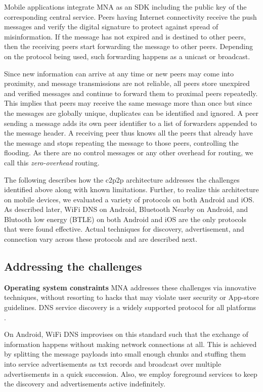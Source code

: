\documentclass[conference]{IEEEtran}
\begin{document}
Mobile applications integrate MNA as an SDK including the public key
of the corresponding central service. Peers having Internet
connectivity receive the push messages and verify the digital
signature to protect against spread of misinformation.  If the message
has not expired and is destined to other peers, then the receiving
peers start forwarding the message to other peers. Depending on the
protocol being used, such forwarding happens as a unicast or
broadcast.

Since new information can arrive at any time or new peers may come
into proximity, and message transmissions are not reliable, all peers
store unexpired and verified messages and continue to forward them to
proximal peers repeatedly. This implies that peers may receive the
same message more than once but since the messages are globally
unique, duplicates can be identified and ignored.  A peer sending a
message adds its own peer identifier to a list of forwarders appended
to the message header.  A receiving peer thus knows all the peers that
already have the message and stops repeating the message to those
peers, controlling the flooding.  As there are no control messages or
any other overhead for routing, we call this \emph{zero-overhead}
routing.

The following describes how the c2p2p architecture addresses the
challenges identified above along with known limitations. Further, to
realize this architecture on mobile devices, we evaluated a variety of
protocols on both Android and iOS. As described later, WiFi DNS on
Android, Bluetooth Nearby on Android, and Blutooth low energy (BTLE)
on both Android and iOS are the only protocols that were found
effective. Actual techniques for discovery, advertisement, and
connection vary across these protocols and are described next.
%
\subsection{Addressing the challenges}
\label{sec:address}
%
\noindent\textbf{Operating system constraints} MNA addresses these
challenges via innovative techniques, without resorting to hacks that
may violate user security or App-store guidelines. DNS service
discovery is a widely supported protocol for all platforms
\cite{cheshire-dns-sd-2013}. 

On Android, WiFi DNS improvises on this standard such that the
exchange of information happens without making network connections at
all. This is achieved by splitting the message payloads into small
enough chunks and stuffing them into service advertisements as txt
records and broadcast over multiple advertisements in a quick
succession. Also, we employ foreground services to keep the discovery
and advertisements active indefinitely.
\end{document}
